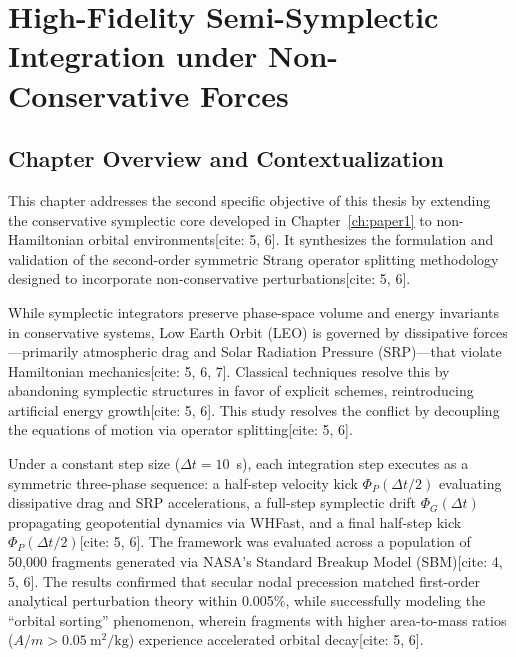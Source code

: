 \documentclass[12pt,letterpaper,twoside]{book}
\begin{document}
\cleardoublepage

\chapter{High-Fidelity Semi-Symplectic Integration under Non-Conservative Forces}
\label{ch:paper2}

\section*{Chapter Overview and Contextualization}
This chapter addresses the second specific objective of this thesis by extending the conservative symplectic core developed in Chapter~\ref{ch:paper1} to non-Hamiltonian orbital environments[cite: 5, 6]. It synthesizes the formulation and validation of the second-order symmetric Strang operator splitting methodology designed to incorporate non-conservative perturbations[cite: 5, 6].

While symplectic integrators preserve phase-space volume and energy invariants in conservative systems, Low Earth Orbit (LEO) is governed by dissipative forces—primarily atmospheric drag and Solar Radiation Pressure (SRP)—that violate Hamiltonian mechanics[cite: 5, 6, 7]. Classical techniques resolve this by abandoning symplectic structures in favor of explicit schemes, reintroducing artificial energy growth[cite: 5, 6]. This study resolves the conflict by decoupling the equations of motion via operator splitting[cite: 5, 6].

Under a constant step size ($\Delta t = 10$~s), each integration step executes as a symmetric three-phase sequence: a half-step velocity kick $\Phi_P(\Delta t/2)$ evaluating dissipative drag and SRP accelerations, a full-step symplectic drift $\Phi_G(\Delta t)$ propagating geopotential dynamics via WHFast, and a final half-step kick $\Phi_P(\Delta t/2)$[cite: 5, 6]. The framework was evaluated across a population of 50,000 fragments generated via NASA's Standard Breakup Model (SBM)[cite: 4, 5, 6]. The results confirmed that secular nodal precession matched first-order analytical perturbation theory within 0.005\%, while successfully modeling the ``orbital sorting'' phenomenon, wherein fragments with higher area-to-mass ratios ($A/m > 0.05~\text{m}^2/\text{kg}$) experience accelerated orbital decay[cite: 5, 6].
\end{document}
